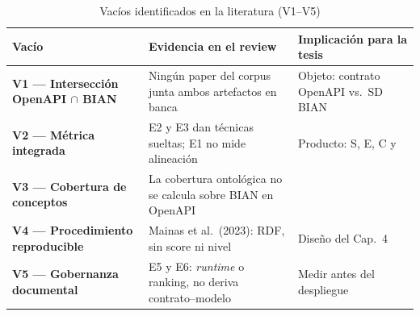 \begin{table}[H]
  \centering
  \caption{Vacíos identificados en la literatura (V1--V5)}
  \label{tab:vacios}
  \small
  \begin{tabular}{@{}p{}p{}p{}@{}}
    \toprule
    \textbf{Vacío} & \textbf{Evidencia en el review} & \textbf{Implicación para la tesis} \\
    \midrule
    \textbf{V1 --- Intersección OpenAPI $\cap$ BIAN} &
    Ningún paper del corpus junta ambos artefactos en banca &
    Objeto: contrato OpenAPI vs.\ SD BIAN \\
    \textbf{V2 --- Métrica integrada} &
    E2 y E3 dan técnicas sueltas; E1 no mide alineación &
    Producto: S, E, C y \AlignmentScore{} \\
    \textbf{V3 --- Cobertura de conceptos} &
    La cobertura ontológica no se calcula sobre \BusinessObject{} BIAN en OpenAPI &
    \CoverageScore{} \\
    \textbf{V4 --- Procedimiento reproducible} &
    Mainas et al.\ (2023): RDF, sin score ni nivel &
    Diseño del Cap.~4 \\
    \textbf{V5 --- Gobernanza documental} &
    E5 y E6: \textit{runtime} o ranking, no deriva contrato--modelo &
    Medir antes del despliegue \\
    \bottomrule
  \end{tabular}
\end{table}
